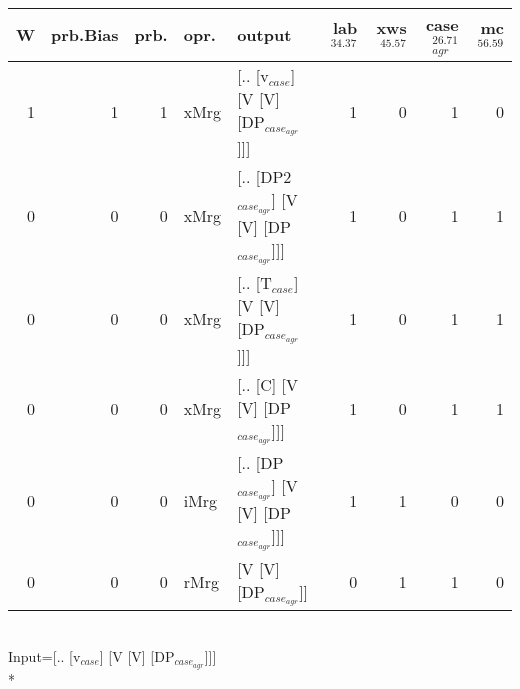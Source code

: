 \begin{tabularx}{\linewidth}{rrrlXrrrr}
\hline
   W &   prb.Bias &   prb. & opr.   & output                                    &   lab$^{34.37}$ &   xws$^{45.57}$ &   case$_{agr}^{26.71}$ &   mc$^{56.59}$ \\
\hline
   1 &       1 &   1 & xMrg & [.. [v$_{case}$] [V [V] [DP$_{case_{agr}}$]]]       &             1 &             0 &                  1 &            0 \\
   0 &       0 &   0 & xMrg & [.. [DP2$_{case_{agr}}$] [V [V] [DP$_{case_{agr}}$]]] &             1 &             0 &                  1 &            1 \\
   0 &       0 &   0 & xMrg & [.. [T$_{case}$] [V [V] [DP$_{case_{agr}}$]]]       &             1 &             0 &                  1 &            1 \\
   0 &       0 &   0 & xMrg & [.. [C] [V [V] [DP$_{case_{agr}}$]]]            &             1 &             0 &                  1 &            1 \\
   0 &       0 &   0 & iMrg & [.. [DP$_{case_{agr}}$] [V [V] [DP$_{case_{agr}}$]]]  &             1 &             1 &                  0 &            0 \\
   0 &       0 &   0 & rMrg & [V [V] [DP$_{case_{agr}}$]]                     &             0 &             1 &                  1 &            0 \\
\hline
\end{tabularx}\endgroup\\
\begingroup\scriptsize Input=[.. [v$_{case}$] [V [V] [DP$_{case_{agr}}$]]]\\*
